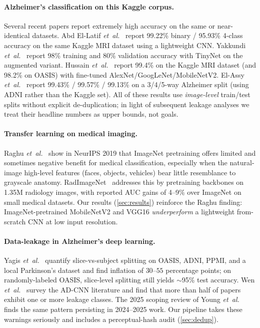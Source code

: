 \documentclass[journal,onecolumn,11pt]{IEEEtran}
\begin{document}
\paragraph{Alzheimer's classification on this Kaggle corpus.}
Several recent papers report extremely high accuracy on the same or near-identical
datasets. Abd El-Latif \textit{et~al.}~\cite{ellatif2023lightweight} report
99.22\% binary / 95.93\% 4-class accuracy on the same Kaggle MRI dataset
using a lightweight CNN. Yakkundi \textit{et~al.}~\cite{yakkundi2024tinynet}
report 98\% training and 80\% validation accuracy with TinyNet on the
augmented variant. Hussain \textit{et~al.}~\cite{hussain2025finetuned}
report 99.4\% on the Kaggle MRI dataset (and 98.2\% on OASIS) with
fine-tuned AlexNet/GoogLeNet/MobileNetV2. El-Assy \textit{et~al.}~\cite{elassy2024novelcnn}
report 99.43\% / 99.57\% / 99.13\% on a 3/4/5-way Alzheimer split (using ADNI
rather than the Kaggle set). All of
these results use \emph{image-level} train/test splits without explicit
de-duplication; in light of subsequent leakage analyses we treat their
headline numbers as upper bounds, not goals.

\paragraph{Transfer learning on medical imaging.}
Raghu \textit{et~al.}~\cite{raghu2019transfusion} show in NeurIPS 2019
that ImageNet pretraining offers limited and sometimes negative benefit for
medical classification, especially when the natural-image high-level features
(faces, objects, vehicles) bear little resemblance to grayscale anatomy.
RadImageNet~\cite{mei2022radimagenet} addresses this by pretraining
backbones on 1.35M radiology images, with reported AUC gains of
4--9\% over ImageNet on small medical datasets. Our results
(\cref{sec:results}) reinforce the Raghu finding: ImageNet-pretrained
MobileNetV2 and VGG16 \emph{underperform} a lightweight from-scratch CNN
at low input resolution.

\paragraph{Data-leakage in Alzheimer's deep learning.}
Yagis \textit{et~al.}~\cite{yagis2021leakage} quantify slice-vs-subject
splitting on OASIS, ADNI, PPMI, and a local Parkinson's dataset and find
inflation of $30$--$55$ percentage points; on randomly-labeled OASIS,
slice-level splitting still yields $\sim$95\% test accuracy. Wen
\textit{et~al.}~\cite{wen2020adcnn} survey the AD-CNN literature and find
that more than half of papers exhibit one or more leakage classes. The
2025 scoping review of Young \textit{et~al.}~\cite{young2025leakage} finds
the same pattern persisting in 2024--2025 work. Our pipeline takes
these warnings seriously and includes a perceptual-hash audit
(\cref{sec:dedup}).
\end{document}
